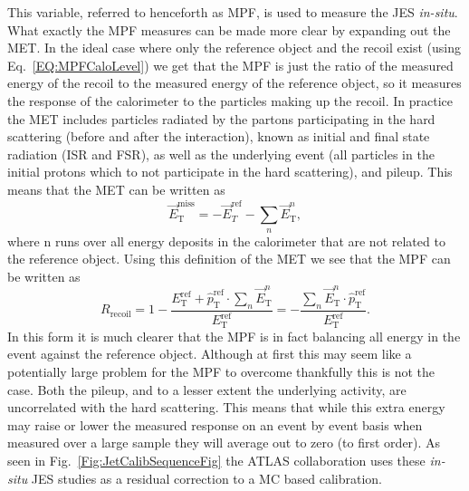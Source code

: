 This variable, referred to henceforth as MPF, is used to measure the JES \textit{in-situ}.  
What exactly the MPF measures can be made more clear by expanding out the MET.  
In the ideal case where only the reference object and the recoil exist (using Eq.~\ref{EQ:MPFCaloLevel}) we get that the MPF is just the ratio of the measured energy of the recoil to the measured energy of the reference object, so it measures the response of the calorimeter to the particles making up the recoil.  
In practice the MET includes particles radiated by the partons participating in the hard scattering (before and after the interaction), known as initial and final state radiation (ISR and FSR), as well as the underlying event (all particles in the initial protons which to not participate in the hard scattering), and pileup.  
This means that the MET can be written as 
\begin{equation}
  \vec{E}_{\mathrm T}^{\mathrm{miss}} = -\vec{E}_{T}^{\mathrm{ref}}-\sum_{n}\vec{E}_{\mathrm T}^{n},
\end{equation}
where n runs over all energy deposits in the calorimeter that are not related to the reference object.  
Using this definition of the MET we see that the MPF can be written as 
\begin{equation}
  R_{\mathrm{recoil}}=1-\frac{E_{\mathrm T}^{\mathrm{ref}}+\hat{p}_{\mathrm T}^{\mathrm{ref}}\cdot\sum_{n}\vec{E}_{\mathrm T}^{n}}{E_{\mathrm T}^{\mathrm{ref}}}=-\frac{\sum_{n}\vec{E}_{\mathrm T}^{n}\cdot\hat{p}_{\mathrm T}^{\mathrm{ref}}}{E_{\mathrm T}^{\mathrm{ref}}}.
\end{equation}
In this form it is much clearer that the MPF is in fact balancing all energy in the event against the reference object.  
Although at first this may seem like a potentially large problem for the MPF to overcome thankfully this is not the case.  
Both the pileup, and to a lesser extent the underlying activity, are uncorrelated with the hard scattering.  
This means that while this extra energy may raise or lower the measured response on an event by event basis when measured over a large sample they will average out to zero (to first order).  
As seen in Fig.~\ref{Fig:JetCalibSequenceFig} the ATLAS collaboration uses these {\textit {in-situ}} JES studies as a residual correction to a MC based calibration.  

